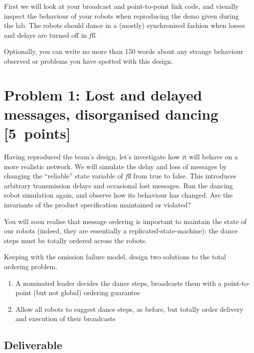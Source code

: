 \documentclass[a4paper]{article}
\begin{document}
First we will look at your broadcast and point-to-point link code, and
visually inspect the behaviour of your robots when reproducing the demo given
during the lab. The robots should dance in a (mostly) synchronised fashion
when losses and delays are turned off in \emph{fll}.

Optionally, you can write no more than 150 words about any strange behaviour
observed or problems you have spotted with this design.





\section*{Problem 1: Lost and delayed messages, disorganised dancing [5~points]} %
\label{sec:dealing_with_unreliable_links}

Having reproduced the team's design, let's investigate how it will behave on
a more realistic network. We will simulate the delay and loss of messages by
changing the ``reliable'' state variable of \emph{fll} from true to false.
This introduces arbitrary transmission delays and occasional lost messages.
Run the dancing robot  simulation again, and observe how its behaviour has
changed. Are the invariants of the product specification maintained or
violated?

You will soon realise that message ordering is important to maintain the state
of our robots (indeed, they are essentially a replicated-state-machine): the
dance steps must be totally ordered across the robots.

Keeping with the omission failure model, design two solutions to the total
ordering problem.
\begin{enumerate}

  \item A nominated leader decides the dance steps, broadcasts them with a
  point-to-point (but not global) ordering guarantee

  \item Allow all robots to suggest dance steps, as before, but totally order
  delivery and execution of their broadcasts

\end{enumerate}

\subsection*{Deliverable} %
\label{sub:p1_deliverable}
\end{document}
